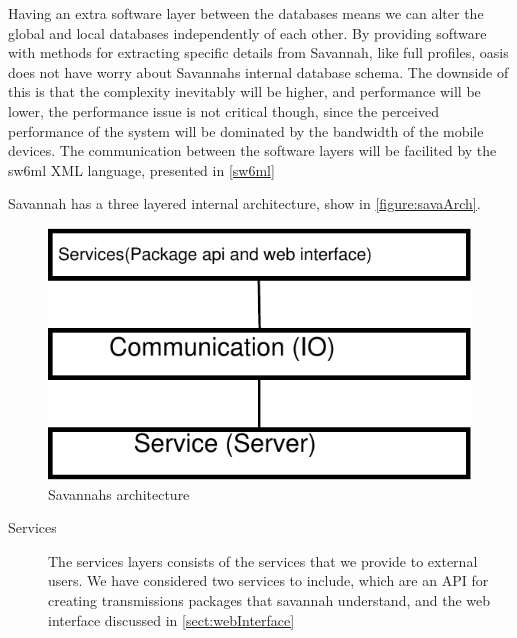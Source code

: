 Having an extra software layer between the databases means we can alter the global and local databases independently of each other. By providing software with methods for extracting specific
details from Savannah, like full profiles, oasis does not have worry about Savannahs internal database schema. The downside of this is that the complexity inevitably will be higher, and performance
will be lower, the performance issue is not critical though, since the perceived performance of the system will be dominated by the bandwidth of the mobile devices. 
The communication between the software layers will be facilited by the sw6ml XML language, presented in \autoref{sw6ml}

Savannah has a three layered internal architecture, show in \autoref{figure:savaArch}.

\begin{figure}[H]
  \centering
    \includegraphics[scale=1]{images/savaArch}
  \caption{Savannahs architecture}
  \label{figure:savaArch}
\end{figure}


\begin{description}
 \item[Services] The services layers consists of the services that we provide to external users. We have considered two services to include, which are an API for creating transmissions packages	 		that savannah understand, and the web interface discussed in \autoref{sect:webInterface}
\end{description}


